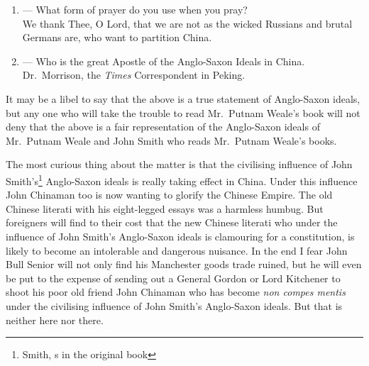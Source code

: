 \begin{enumerate}
    \item --- What form of prayer do you use when you pray? \\ We thank Thee, O Lord, that we are not as the wicked Russians and brutal Germans are, who want to partition China.
    \item --- Who is the great Apostle  of the Anglo-Saxon Ideals in China. \\ Dr.~Morrison,  the \emph{Times} Correspondent in Peking.
\end{enumerate}

It may be a libel to say that the above is a true statement of Anglo-Saxon ideals, but any one who will take the trouble to read Mr.~Putnam Weale's book will not deny that the above is a fair representation of the Anglo-Saxon ideals of Mr.~Putnam Weale and John Smith who reads Mr.~Putnam Weale's books.

The most curious thing about the matter is that the civilising influence of John Smith's\footnote{Smith, s in the original book} Anglo-Saxon ideals is really taking effect in China.
Under this influence John Chinaman too is now wanting to glorify the Chinese Empire.
The old Chinese literati with his eight-legged essays  was a harmless humbug.
But foreigners will find to their cost that the new Chinese literati who under the influence of John Smith's Anglo-Saxon ideals is clamouring for a constitution, is likely to become an intolerable and dangerous nuisance.
In the end I fear John Bull Senior will not only find his Manchester goods trade ruined, but he will even be put to the expense of sending out a General Gordon  or Lord Kitchener  to shoot his poor old friend John Chinaman who has become \emph{non compes mentis}   under the civilising influence of John Smith's Anglo-Saxon ideals.
But that is neither here nor there.

